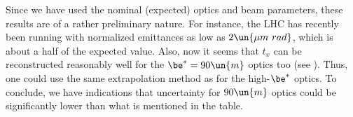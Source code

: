 Since we have used the nominal (expected) optics and beam parameters, these results are of a rather preliminary nature. For instance, the LHC has recently been running with normalized emittances as low as $2 \un{\mu m\ rad}$, which is about a half of the expected value. Also, now it seems that $t_x$ can be reconstructed reasonably well for the $\be^* = 90\un{m}$ optics too (see ). Thus, one could use the same extrapolation method as for the high-$\be^*$ optics. To conclude, we have indications that uncertainty for $90\un{m}$ optics could be significantly lower than what is mentioned in the table.

